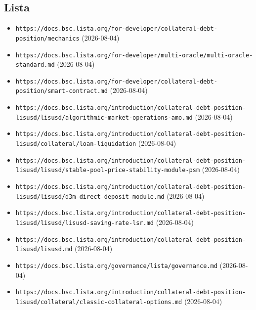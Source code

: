 \subsection*{Lista}
\begin{itemize}\setlength{\itemsep}{0pt}\small
\item \texttt{https://docs.bsc.lista.org/for-developer/collateral-debt-position/mechanics} (2026-08-04)
\item \texttt{https://docs.bsc.lista.org/for-developer/multi-oracle/multi-oracle-standard.md} (2026-08-04)
\item \texttt{https://docs.bsc.lista.org/for-developer/collateral-debt-position/smart-contract.md} (2026-08-04)
\item \texttt{https://docs.bsc.lista.org/introduction/collateral-debt-position-lisusd/lisusd/algorithmic-market-operations-amo.md} (2026-08-04)
\item \texttt{https://docs.bsc.lista.org/introduction/collateral-debt-position-lisusd/collateral/loan-liquidation} (2026-08-04)
\item \texttt{https://docs.bsc.lista.org/introduction/collateral-debt-position-lisusd/lisusd/stable-pool-price-stability-module-psm} (2026-08-04)
\item \texttt{https://docs.bsc.lista.org/introduction/collateral-debt-position-lisusd/lisusd/d3m-direct-deposit-module.md} (2026-08-04)
\item \texttt{https://docs.bsc.lista.org/introduction/collateral-debt-position-lisusd/lisusd/lisusd-saving-rate-lsr.md} (2026-08-04)
\item \texttt{https://docs.bsc.lista.org/introduction/collateral-debt-position-lisusd/lisusd.md} (2026-08-04)
\item \texttt{https://docs.bsc.lista.org/governance/lista/governance.md} (2026-08-04)
\item \texttt{https://docs.bsc.lista.org/introduction/collateral-debt-position-lisusd/collateral/classic-collateral-options.md} (2026-08-04)
\end{itemize}

